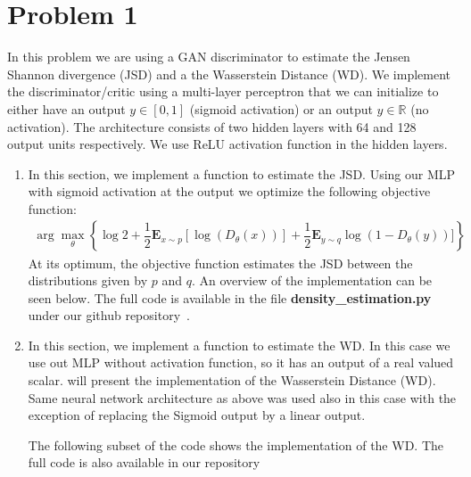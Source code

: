 \section*{Problem 1}
In this problem we are using a GAN discriminator to estimate the Jensen Shannon divergence (JSD) and a the Wasserstein Distance (WD). We implement the discriminator/critic using a multi-layer perceptron that we can initialize to either have an output $y\in[0,1]$ (sigmoid activation) or an output $y\in\mathbb{R}$ (no activation). The architecture consists of two hidden layers with 64 and 128 output units respectively. We use ReLU activation function in the hidden layers.

\begin{enumerate}
	\item In this section, we implement a function to estimate the JSD. Using our MLP with sigmoid activation at the output we optimize the following objective function: 
	\begin{align*}
     \arg\max_{\theta}\left\{ \log2 + \dfrac{1}{2}\mathbf{E}_{x\sim p}[\log(D_\theta (x))] + \dfrac{1}{2}\mathbf{E}_{y\sim q}\log(1-D_\theta (y))]\right\}
	\end{align*}
	At its optimum, the objective function estimates the JSD between the distributions given by $p$ and $q$.
%	
%
	An overview of the implementation can be seen below. The full code is available in the file \textbf{density\_estimation.py} under our github repository~\cite{github}.
	
	
	
	\item In this section, we implement a function to estimate the WD. In this case we use out MLP without activation function, so it has an output of a real valued scalar.
	will present the implementation of the Wasserstein Distance (WD). Same neural network architecture as above was used also in this case with the exception of replacing the Sigmoid output by a linear output.
	
	The following subset of the code shows the implementation of the WD. The full code is also available in our repository~\cite{github}
	

\end{enumerate}
